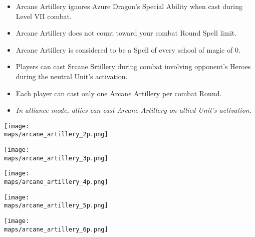 \begin{multicols}{2}
\begin{itemize}
  \item Arcane Artillery ignores Azure Dragon's Special Ability when cast during Level VII combat.
  \item Arcane Artillery does not count toward your combat Round Spell limit.
  \item Arcane Artillery is considered to be a Spell of every school of magic of  0.
  \item Players can cast Srcane Srtillery during combat involving opponent's Heroes during the neutral Unit's activation.
  \item Each player can cast only one Arcane Artillery per combat Round.
  \item \textit{In alliance mode, allies can cast Arcane Artillery on allied Unit's activation.}
\end{itemize}

\end{multicols}

\newpage

  \begin{minipage}{0.4\paperwidth}
    \centering
    \texttt{[image: \\maps/arcane\_artillery\_2p.png]}
  \end{minipage}
  \vspace{1em}
  \linebreak
  \begin{minipage}{0.4\paperwidth}
    \centering
    \texttt{[image: \\maps/arcane\_artillery\_3p.png]}
  \end{minipage}
  \begin{minipage}{0.4\paperwidth}
    \centering
    \texttt{[image: \\maps/arcane\_artillery\_4p.png]}
  \end{minipage}
  \vspace{1em}
  \linebreak
  \begin{minipage}{0.4\paperwidth}
    \centering
    \texttt{[image: \\maps/arcane\_artillery\_5p.png]}
  \end{minipage}
  \begin{minipage}{0.4\paperwidth}
    \centering
    \texttt{[image: \\maps/arcane\_artillery\_6p.png]}
  \end{minipage}

